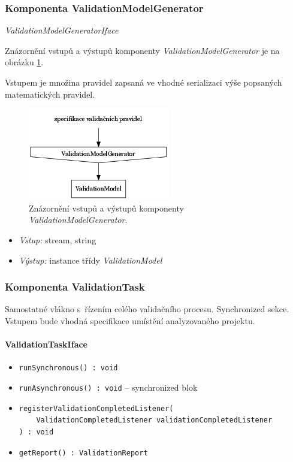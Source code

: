\subsubsection{Komponenta ValidationModelGenerator}
\emph{ValidationModelGeneratorIface}

Znázornění vstupů a výstupů komponenty \emph{ValidationModelGenerator} je na obrázku \ref{design-validation_model_generator_io}.

Vstupem je množina pravidel zapsaná ve vhodné serializaci výše popsaných matematických pravidel.

\begin{figure}[h!]
  \centering
  \includegraphics[width=0.55\textwidth]{./graphs/validation_model_generator_io_graph.png}
  \caption{Znázornění vstupů a výstupů komponenty \emph{ValidationModelGenerator}.\label{design-validation_model_generator_io}}
\end{figure}

\begin{itemize}
\item \emph{Vstup:} stream, string
\item \emph{Výstup:} instance třídy \emph{ValidationModel}
\end{itemize}

\subsubsection{Komponenta ValidationTask}

Samostatné vlákno s~řízením celého validačního procesu. Synchronized sekce. Vstupem bude vhodná specifikace umístění analyzovaného projektu.

\paragraph{ValidationTaskIface}
\begin{itemize}
\item \verb-runSynchronous() : void-
\item \verb-runAsynchronous() : void- -- synchronized blok
\item \begin{verbatim}registerValidationCompletedListener(
    ValidationCompletedListener validationCompletedListener
) : void\end{verbatim}
\item \verb-getReport() : ValidationReport-
\end{itemize}

